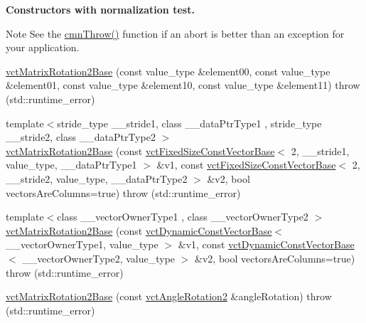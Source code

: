 \begin{Indent}{\bf Constructors with normalization test.}
{\begin{DoxyNote}{Note}
See the \hyperlink{_minimal_cmn_8h_ad50e82cf9c9dbd0e6443c13e0d1a6f1a}{cmn\-Throw()} function if an {\ttfamily abort} is better than an exception for your application. 
\end{DoxyNote}
}\begin{DoxyCompactItemize}
\item 
\hyperlink{classvct_matrix_rotation2_base_ada611c08e92cdb65e9497eca2cffbd47}{vct\-Matrix\-Rotation2\-Base} (const value\-\_\-type \&element00, const value\-\_\-type \&element01, const value\-\_\-type \&element10, const value\-\_\-type \&element11)  throw (std\-::runtime\-\_\-error)
\item 
{\footnotesize template$<$stride\-\_\-type \-\_\-\-\_\-stride1, class \-\_\-\-\_\-data\-Ptr\-Type1 , stride\-\_\-type \-\_\-\-\_\-stride2, class \-\_\-\-\_\-data\-Ptr\-Type2 $>$ }\\\hyperlink{classvct_matrix_rotation2_base_a76405410d06af1b84d1142c96f545002}{vct\-Matrix\-Rotation2\-Base} (const \hyperlink{classvct_fixed_size_const_vector_base}{vct\-Fixed\-Size\-Const\-Vector\-Base}$<$ 2, \-\_\-\-\_\-stride1, value\-\_\-type, \-\_\-\-\_\-data\-Ptr\-Type1 $>$ \&v1, const \hyperlink{classvct_fixed_size_const_vector_base}{vct\-Fixed\-Size\-Const\-Vector\-Base}$<$ 2, \-\_\-\-\_\-stride2, value\-\_\-type, \-\_\-\-\_\-data\-Ptr\-Type2 $>$ \&v2, bool vectors\-Are\-Columns=true)  throw (std\-::runtime\-\_\-error)
\item 
{\footnotesize template$<$class \-\_\-\-\_\-vector\-Owner\-Type1 , class \-\_\-\-\_\-vector\-Owner\-Type2 $>$ }\\\hyperlink{classvct_matrix_rotation2_base_aba308a285f57f40d7b50b7615334dd38}{vct\-Matrix\-Rotation2\-Base} (const \hyperlink{classvct_dynamic_const_vector_base}{vct\-Dynamic\-Const\-Vector\-Base}$<$ \-\_\-\-\_\-vector\-Owner\-Type1, value\-\_\-type $>$ \&v1, const \hyperlink{classvct_dynamic_const_vector_base}{vct\-Dynamic\-Const\-Vector\-Base}$<$ \-\_\-\-\_\-vector\-Owner\-Type2, value\-\_\-type $>$ \&v2, bool vectors\-Are\-Columns=true)  throw (std\-::runtime\-\_\-error)
\item 
\hyperlink{classvct_matrix_rotation2_base_a365284171b3f5482c4e261af52d4f650}{vct\-Matrix\-Rotation2\-Base} (const \hyperlink{classvct_angle_rotation2}{vct\-Angle\-Rotation2} \&angle\-Rotation)  throw (std\-::runtime\-\_\-error)
\end{DoxyCompactItemize}
\end{Indent}
